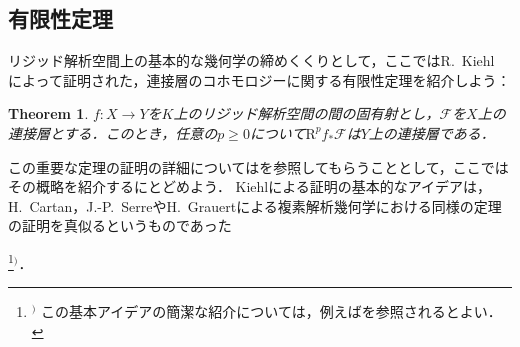 \documentclass[a4paper,12pt, dvipdfmx]{jsbook}
\def\RD{\mathrm{R}}
\theoremstyle{plain}
\newtheorem{thm}{\bfseries Theorem}[section]
\theoremstyle{definition}
\newcounter{chushaku}
\def\chu#1{\addtocounter{chushaku}{1}\footnote[\value{chushaku}]{${}^)$ #1}${}^)$}
\begin{document}
\subsection{有限性定理}\label{sub-finitudes}
リジッド解析空間上の基本的な幾何学の締めくくりとして，ここではR.\ Kiehl \cite{Kieh1}によって証明された，連接層のコホモロジーに関する有限性定理を紹介しよう：
\begin{thm}\label{thm-finitudes}{\rm 
$f\colon X\rightarrow Y$を$K$上のリジッド解析空間の間の固有射とし，$\mathscr{F}$を$X$上の連接層とする．このとき，任意の$p\geq 0$について$\RD^pf_{\ast}\mathscr{F}$は$Y$上の連接層である．}
\end{thm}

この重要な定理の証明の詳細については\cite{Kieh1}を参照してもらうこととして，ここではその概略を紹介するにとどめよう．
Kiehlによる証明の基本的なアイデアは，H.\ Cartan，J.-P.\ SerreやH.\ Grauertによる複素解析幾何学における同様の定理の証明を真似るというものであった\chu{この基本アイデアの簡潔な紹介については，例えば\cite{Douady}を参照されるとよい．}．
\end{document}
